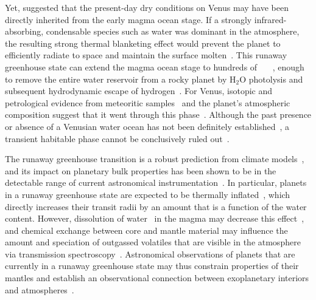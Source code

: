 \documentclass[twocolumn,twocolappendix]{aastex631}
\begin{document}
Yet, \citet{Hamano2013} suggested that the present-day dry conditions on Venus may have been directly inherited from the early magma ocean stage.%
If a strongly infrared-absorbing, condensable species such as water was dominant in the atmosphere, the resulting strong thermal blanketing effect would prevent the planet to efficiently radiate to space and maintain the surface molten~\citep{Ingersoll1969,Kasting1988,2010ppc..book.....P,Goldblatt2013,2015ExA....40..449L,2017JGRE..122.1458S}.
This runaway greenhouse state can extend the magma ocean stage to hundreds of \SI{}{\mega\year}~\citep{2016ApJ...829...63S,2021AsBio..21.1325B}, enough to remove the entire water reservoir from a rocky planet by H$_2$O photolysis and subsequent hydrodynamic escape of hydrogen~\citep{2013ApJ...778..154W,2014ApJ...785L..20W,Luger2015}.
For Venus, isotopic and petrological evidence from meteoritic samples~\citep{2018SSRv..214...36A,2022Natur.611..245B} and the planet's atmospheric composition suggest that it went through this phase~\citep{2020NatGe..13..265G}.
Although the past presence or absence of a Venusian water ocean has not been definitely established~\citep{Raymond2006,Raymond2007,Hamano2013,Way2016,2019JGRE..124.2015K,2021JGRE..12606643K,Turbet2021,2023PNAS..12009751W}, a transient habitable phase cannot be conclusively ruled out~\citep[e.g.,][]{Way2016,Salvador2017,Krissansen-Totton2021}.

The runaway greenhouse transition is a robust prediction from climate models~\citep{Kasting1988,Nakajima1992,Goldblatt2012,Forget2014,Boukrouche2021,2022A&A...658A..40C}, and its impact on planetary bulk properties has been shown to be in the detectable range of current astronomical instrumentation~\citep{Goldblatt2015}.
In particular, planets in a runaway greenhouse state are expected to be thermally inflated~\citep{Turbet2019,Turbet2020,Mousis2020}, which directly increases their transit radii by an amount that is a function of the water content.
However, dissolution of water~\citep[e.g.,][]{Elkins-Tanton2008,Hier-Majumder2017,Salvador2023} in the magma may decrease this effect~\citep{Dorn2021}, and chemical exchange between core and mantle material may influence the amount and speciation of outgassed volatiles that are visible in the atmosphere via transmission spectroscopy~\citep{2021ApJ...914L...4L,Schlichting2022}.
Astronomical observations of planets that are currently in a runaway greenhouse state may thus constrain properties of their mantles and establish an observational connection between exoplanetary interiors and atmospheres~\citep{Lichtenberg2022,Wordsworth2022}.
\end{document}
